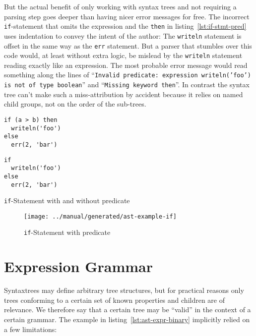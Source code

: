\documentclass[sigconf,natbib=false,review=true,anonymous]{acmart}
\newcommand\astScale{0.75}
\begin{document}
But the actual benefit of only working with syntax trees and not requiring a parsing step goes deeper than having nicer error messages for free. The incorrect \texttt{if}-statement that omits the expression and the \texttt{then} in listing~\ref{lst:if-stmt-pred} uses indentation to convey the intent of the author: The \texttt{writeln} statement is offset in the same way as the \texttt{err} statement. But a parser that stumbles over this code would, at least without extra logic, be mislead by the \texttt{writeln} statement reading exactly like an expression. The most probable error message would read something along the lines of \enquote{\texttt{Invalid predicate: expression writeln('foo') is not of type boolean}} and \enquote{\texttt{Missing keyword then}}. In contrast the syntax tree can't make such a miss-attribution by accident because it relies on named child groups, not on the order of the sub-trees.

\begin{listing}[H]
\begin{minipage}{.20\textwidth}
\begin{verbatim}
if (a > b) then
  writeln('foo')
else
  err(2, 'bar')
\end{verbatim}
\end{minipage}
\begin{minipage}{.20\textwidth}
\begin{verbatim}
if
  writeln('foo')
else
  err(2, 'bar')
\end{verbatim}
\end{minipage}
\caption{\texttt{if}-Statement with and without predicate}
\label{lst:if-stmt-pred}
\end{listing}

\begin{figure*}
  \texttt{[image: ../manual/generated/ast-example-if]}
  \caption{\texttt{if}-Statement with predicate}
  \label{fig:if-stmt-pred}
\end{figure*}

\section{Expression Grammar}

Syntaxtrees may define arbitrary tree structures, but for practical reasons only trees conforming to a certain set of known properties and children are of relevance. We therefore say that a certain tree may be \enquote{valid} in the context of a certain grammar. The example in listing~\ref{lst:ast-expr-binary} implicitly relied on a few limitations:
\end{document}
